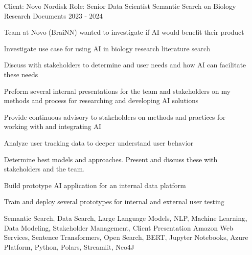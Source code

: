 


\begin{cventries}


\cventry
{Client: Novo Nordisk \newline Role: Senior Data Scientist} %
{Semantic Search on Biology Research Documents} %
{}%
{2023 - 2024} %
{ %
\begin{cvitems}
\item {Team at Novo (BraiNN) wanted to investigate if AI would benefit their product}
\item {Investigate use case for using AI in biology research literature search}
\item {Discuss with stakeholders to determine and user needs and how AI can facilitate these needs}
\item {Preform several internal presentations for the team and stakeholders on my methods and process for researching and developing AI solutions}
\item {Provide continuous advisory to stakeholders on methods and practices for working with and integrating AI}
\item {Analyze user tracking data to deeper understand user behavior}
\item {Determine best models and approaches. Present and discuss these with stakeholders and the team.}
\item {Build prototype AI application for an internal data platform}
\item {Train and deploy several prototypes for internal and external user testing}
\end{cvitems}
\cventrykeywords
{Semantic Search, Data Search, Large Language Models, NLP, Machine Learning, Data Modeling, Stakeholder Management, Client Presentation}
{Amazon Web Services, Sentence Transformers, Open Search, BERT, Jupyter Notebooks, Azure Platform, Python, Polars, Streamlit, Neo4J}
}


\end{cventries}
